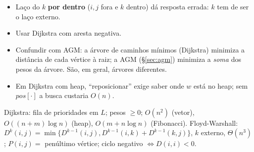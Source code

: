 \begin{cuidado}
\begin{itemize}
  \item Laço do $k$ \textbf{por dentro} ($i,j$ fora e $k$ dentro) dá resposta errada: $k$ tem de ser o laço externo.
  \item Usar Dijkstra com aresta negativa.
  \item Confundir com AGM: a árvore de caminhos mínimos (Dijkstra) minimiza a distância de cada vértice à raiz; a AGM (§\ref{sec:agm}) minimiza a \emph{soma} dos pesos da árvore. São, em geral, árvores diferentes.
  \item Em Dijkstra com heap, ``reposicionar'' exige saber onde $w$ está no heap; sem $pos[\cdot]$ a busca custaria $O(n)$.
\end{itemize}
\end{cuidado}

\begin{chave}
Dijkstra: fila de prioridades em $L$; pesos $\ge0$; $O(n^2)$ (vetor), $O((n+m)\log n)$ (heap), $O(m+n\log n)$ (Fibonacci). Floyd-Warshall: $D^k(i,j)=\min\{D^{k-1}(i,j),D^{k-1}(i,k)+D^{k-1}(k,j)\}$, $k$ externo, $\Theta(n^3)$; $P(i,j)=$ penúltimo vértice; ciclo negativo $\iff D(i,i)<0$.
\end{chave}
